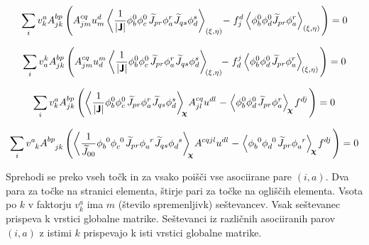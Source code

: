 \begin{equation}
   \sum_i v^a_k A^{bp}_{jk} \left(A^{cq}_{jm} u^d_m \left\langle \frac{1}{|\bm{\mathsf{J}}|} \phi^0_b \phi^0_c \mkern2mu \widetilde{J}_{pr}  \phi^r_a \mkern1mu \widetilde{J}_{qs}  \phi^s_d \right\rangle_{(\xi, \eta)} \mkern-4mu - \mkern1mu f^d_j \left\langle\phi^0_b \phi^0_d \widetilde{J}_{pr}  \phi^r_a \right\rangle_{(\xi, \eta)} \mkern2mu \right) = 0
\end{equation}

\begin{equation}
   \sum_i v^k_a A^{bp}_{jk} \left(A^{cq}_{jm} u^m_d \left\langle \frac{1}{|\bm{\mathsf{J}}|} \phi^0_b \phi^0_c \mkern2mu \widetilde{J}_{pr}  \phi^r_a \mkern1mu \widetilde{J}_{qs}  \phi^s_d \right\rangle_{\mkern-4mu(\xi, \eta)} \mkern-6mu - \mkern1mu f^j_d \left\langle\phi^0_b \phi^0_d \mkern2mu \widetilde{J}_{pr}  \phi^r_a \right\rangle_{\mkern-2mu(\xi, \eta)} \mkern2mu \right) = 0
\end{equation}

\begin{equation}
   \sum_i v^a_k A^{bp}_{jk} \left( \left\langle \frac{1}{|\bm{\mathsf{J}}|} \phi^0_b \phi^0_c \mkern2mu \widetilde{J}_{pr}  \phi^r_a \mkern1mu \widetilde{J}_{qs}  \phi^s_d \right\rangle_{\mkern-5mu\bm{\chi}} \mkern-2mu A^{cq}_{jl} u^{dl} \mkern1mu - \mkern1mu \left\langle\phi^0_b \phi^0_d \mkern2mu \widetilde{J}_{pr}  \phi^r_a \right\rangle_{\mkern-3mu\bm{\chi}} \mkern-1mu f^{dj} \mkern2mu \right) = 0
\end{equation}

\begin{equation}
   \sum_i v^a_{\phantom{a}k} A^{bp}_{\phantom{bp}jk} \left( \left\langle \frac{1}{\widetilde{J}_{00}} \phi^{\phantom{b}0}_b \phi^{\phantom{c}0}_c \mkern2mu \widetilde{J}_{pr}  \phi^{\phantom{a}r}_a \mkern1mu \widetilde{J}_{qs}  \phi^{\phantom{d}s}_d \right\rangle_{\mkern-5mu\bm{\chi}} \mkern-2mu A^{cqjl} u^{dl} \mkern1mu - \mkern1mu \left\langle\phi^{\phantom{b}0}_b \phi^{\phantom{d}0}_d \mkern2mu \widetilde{J}_{pr}  \phi^{\phantom{a}r}_a \right\rangle_{\mkern-3mu\bm{\chi}} \mkern-1mu f^{dj} \mkern2mu \right) = 0
\end{equation}

Sprehodi se preko vseh točk in za vsako poišči vse asociirane pare $(i, a)$. Dva para za točke na stranici elementa, štirje pari za točke na ogliščih elementa. Vsota po $k$ v faktorju $v^a_k$ ima $m$ (število spremenljivk) seštevancev. Vsak seštevanec prispeva k vrstici globalne matrike. Seštevanci iz različnih asociiranih parov $(i, a)$ z istimi $k$ prispevajo k isti vrstici globalne matrike.

